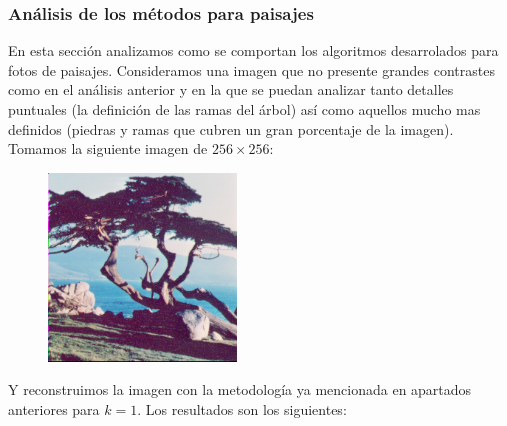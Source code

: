 \subsubsection{Análisis de los métodos para paisajes}

En esta sección analizamos como se comportan los algoritmos desarrolados para fotos de paisajes. Consideramos una imagen que no presente grandes contrastes como en el análisis anterior y en la que se puedan analizar tanto detalles puntuales (la definición de las ramas del árbol) así como aquellos mucho mas definidos (piedras y ramas que cubren un gran porcentaje de la imagen). Tomamos la siguiente imagen de $256 \times 256$:

\begin{figure}[H]
\centering
\includegraphics[width=5cm]{fotos/paisaje/orig.png}
\end{figure}

Y reconstruimos la imagen con la metodología ya mencionada en apartados anteriores para $k=1$. Los resultados son los siguientes:

